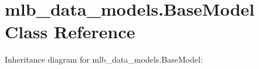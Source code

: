 \hypertarget{classmlb__data__models_1_1BaseModel}{}\section{mlb\+\_\+data\+\_\+models.\+Base\+Model Class Reference}
\label{classmlb__data__models_1_1BaseModel}


Inheritance diagram for mlb\+\_\+data\+\_\+models.\+Base\+Model\+:
